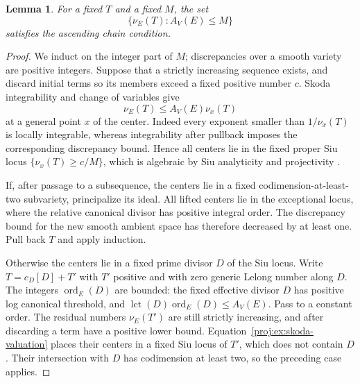\documentclass[11pt,letterpaper]{article}
\DeclareMathOperator{\ord}{ord}
\newtheorem{lemma}[theorem]{Lemma}
\theoremstyle{definition}
\theoremstyle{remark}
\begin{document}
\begin{lemma}\label{proj:ex:valuation-acc}
For a fixed \(T\) and a fixed \(M\), the set
\[
 \{\nu_E(T): A_V(E)\leq M\}
\]
satisfies the ascending chain condition.
\end{lemma}
\begin{proof}
We induct on the integer part of \(M\); discrepancies over a
smooth variety are positive integers. Suppose that a strictly
increasing sequence exists, and discard initial terms so its
members exceed a fixed positive number \(c\).
Skoda integrability and change of variables give
\begin{equation}\label{proj:ex:skoda-valuation}
 \nu_E(T)\leq A_V(E)\nu_x(T)
\end{equation}
at a general point \(x\) of the center. Indeed every exponent
smaller than \(1/\nu_x(T)\) is locally integrable, whereas
integrability after pullback imposes the corresponding
discrepancy bound. Hence all centers lie in the fixed proper Siu
locus \(\{\nu_x(T)\geq c/M\}\), which is algebraic by Siu
analyticity and projectivity \cite{Proj-Siu1974}.

If, after passage to a subsequence, the centers lie in a fixed
codimension-at-least-two subvariety, principalize its ideal.
All lifted centers lie in the exceptional locus, where the
relative canonical divisor has positive integral order.
The discrepancy bound for the new smooth ambient space has
therefore decreased by at least one. Pull back \(T\) and apply
induction.

Otherwise the centers lie in a fixed prime divisor \(D\) of the
Siu locus. Write \(T=c_D[D]+T'\) with \(T'\) positive and with
zero generic Lelong number along \(D\). The integers
\(\ord_E(D)\) are bounded: the fixed effective divisor \(D\) has
positive log canonical threshold, and
\(\operatorname{lct}(D)\ord_E(D)\leq A_V(E)\).
Pass to a constant order. The residual numbers \(\nu_E(T')\)
are still strictly increasing, and after discarding a term have
a positive lower bound. Equation~\eqref{proj:ex:skoda-valuation}
places their centers in a fixed Siu locus of \(T'\), which does
not contain \(D\). Their intersection with \(D\) has codimension
at least two, so the preceding case applies.
\end{proof}
\end{document}
